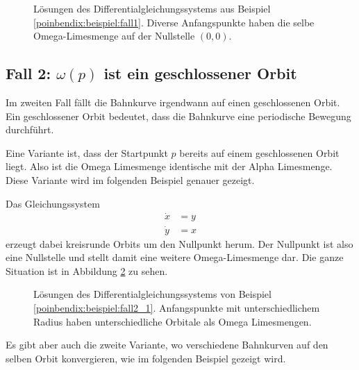 \begin{figure}
    \centering
    
    \caption{Lösungen des Differentialgleichungssystems aus Beispiel \ref{poinbendix:beispiel:fall1}.
    Diverse Anfangspunkte haben die selbe Omega-Limesmenge auf der Nullstelle $(0,0)$.}
    \label{poinbendix:fig:fixed_point_omega_set}
\end{figure}

\subsection{Fall 2: $\omega(p)$ ist ein geschlossener Orbit} \label{poinbendix:subsection:fall2}

Im zweiten Fall fällt die Bahnkurve irgendwann auf einen geschlossenen Orbit.
Ein geschlossener Orbit bedeutet, dass die Bahnkurve eine periodische Bewegung durchführt.

Eine Variante ist, dass der Startpunkt $p$ bereits auf einem geschlossenen Orbit liegt.
Also ist die Omega Limesmenge identische mit der Alpha Limesmenge.
Diese Variante wird im folgenden Beispiel genauer gezeigt.


\begin{beispiel} \label{poinbendix:beispiel:fall2_1}
Das Gleichungssystem
\begin{align*}
    \dot{x} &= y \\
    \dot{y} &= x
\end{align*}
erzeugt dabei kreisrunde Orbits um den Nullpunkt herum.
Der Nullpunkt ist also eine Nullstelle und stellt damit eine weitere Omega-Limesmenge dar.
Die ganze Situation ist in Abbildung \ref{poinbendix:fig:fall_2} zu sehen.
\end{beispiel}

\begin{figure}
\centering
    
    \caption{Lösungen des Differentialgleichungssystems von Beispiel \ref{poinbendix:beispiel:fall2_1}.
    Anfangspunkte mit unterschiedlichem Radius haben unterschiedliche Orbitale als Omega Limesmengen.}
\label{poinbendix:fig:fall_2}
\end{figure}

Es gibt aber auch die zweite Variante, wo verschiedene Bahnkurven auf den selben Orbit konvergieren, wie im folgenden Beispiel gezeigt wird.

